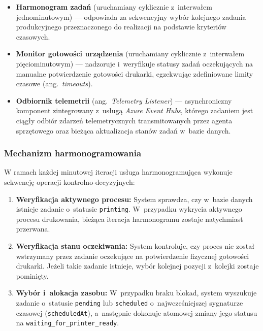 \documentclass[a4paper,12pt,reqno]{article}
\begin{document}
\begin{itemize}
	\item \textbf{Harmonogram zadań} (uruchamiany cyklicznie z~interwałem jednominutowym) --- odpowiada za sekwencyjny wybór kolejnego zadania produkcyjnego przeznaczonego do realizacji na podstawie kryteriów czasowych.
	
	\item \textbf{Monitor gotowości urządzenia} (uruchamiany cyklicznie z~interwałem pięciominutowym) --- nadzoruje i~weryfikuje statusy zadań oczekujących na manualne potwierdzenie gotowości drukarki, egzekwując zdefiniowane limity czasowe (ang.~\textit{timeouts}).
	
	\item \textbf{Odbiornik telemetrii} (ang.~\textit{Telemetry Listener}) --- asynchroniczny komponent zintegrowany z~usługą \textit{Azure Event Hubs}, którego zadaniem jest ciągły odbiór zdarzeń telemetrycznych transmitowanych przez agenta sprzętowego oraz bieżąca aktualizacja stanów zadań w~bazie danych.
\end{itemize}

\subsubsection{Mechanizm harmonogramowania}

W ramach każdej minutowej iteracji usługa harmonogramująca wykonuje sekwencję operacji kontrolno-decyzyjnych:

\begin{enumerate}
	\item \textbf{Weryfikacja aktywnego procesu:} System sprawdza, czy w~bazie danych istnieje zadanie o~statusie \texttt{printing}. W~przypadku wykrycia aktywnego procesu drukowania, bieżąca iteracja harmonogramu zostaje natychmiast przerwana.
	
	\item \textbf{Weryfikacja stanu oczekiwania:} System kontroluje, czy proces nie został wstrzymany przez zadanie oczekujące na potwierdzenie fizycznej gotowości drukarki. Jeżeli takie zadanie istnieje, wybór kolejnej pozycji z~kolejki zostaje pominięty.
	
	\item \textbf{Wybór i~alokacja zasobu:} W~przypadku braku blokad, system wyszukuje zadanie o~statusie \texttt{pending} lub \texttt{scheduled} o~najwcześniejszej sygnaturze czasowej (\texttt{scheduledAt}), a~następnie dokonuje atomowej zmiany jego statusu na \texttt{waiting\_for\_printer\_ready}.
\end{enumerate}
\end{document}
